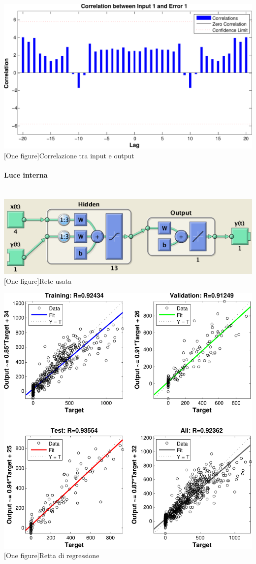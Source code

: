 \includegraphics[scale=0.5]{images/timeseries/energia/correlations.pdf}
[One figure]{Correlazione tra input e output}
\vspace{20px}


\paragraph{Luce interna}
\hspace{10px} \\
\vspace{20px}
\includegraphics[scale=0.5]{images/timeseries/inlight/net.png}
[One figure]{Rete usata}
\vspace{20px}

\includegraphics[scale=0.5]{images/timeseries/inlight/regressions.pdf}
[One figure]{Retta di regressione}
\vspace{20px}

